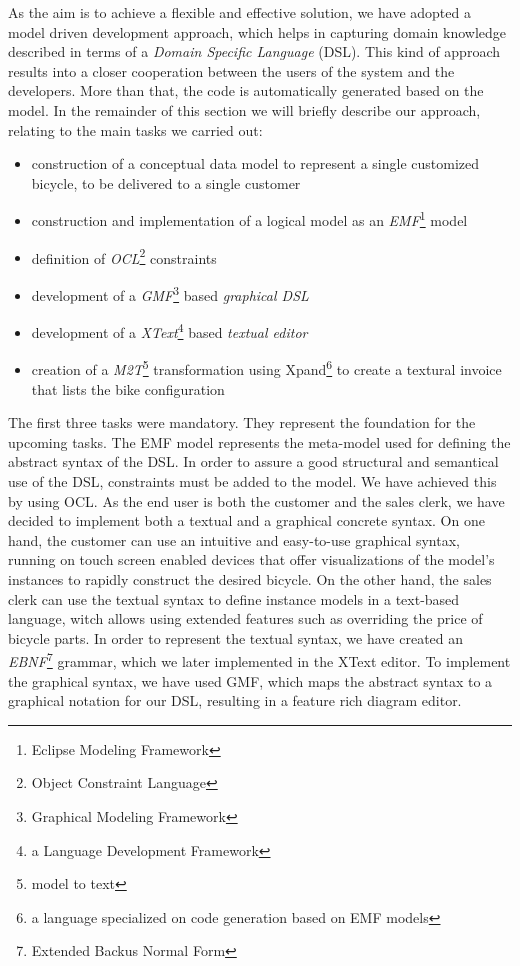 \noindent As the aim is to achieve a flexible and effective solution, we have
adopted a model driven development approach, which helps in capturing domain
knowledge described in terms of a \emph{Domain Specific Language} (DSL). This
kind of approach results into a closer cooperation between the users of the
system and the developers. More than that, the code is automatically generated
based on the model. In the remainder of this section we will briefly describe
our approach, relating to the main tasks we carried out:
\begin{itemize}
  \item construction of a conceptual data model to represent a single customized
  bicycle, to be delivered to a single customer
  \item construction and implementation of a logical model as an
  \emph{EMF}\footnote{Eclipse Modeling Framework} model
  \item definition of \emph{OCL}\footnote{Object Constraint Language}
  constraints
  \item development of a \emph{GMF}\footnote{Graphical Modeling Framework} based
  \emph{graphical DSL}
  \item development of a \emph{XText}\footnote{a Language Development Framework}
  based \emph{textual editor}
  \item creation of a \emph{M2T}\footnote{model to text} transformation using
  Xpand\footnote{a language specialized on code generation based on EMF models}
  to create a textural invoice that lists the bike configuration
\end{itemize} 

\noindent The first three tasks were mandatory. They represent the foundation
for the upcoming tasks. The EMF model represents the meta-model used for
defining the abstract syntax of the DSL. In order to assure a good structural
and semantical use of the DSL, constraints must be added to the model. We have
achieved this by using OCL. As the end user is both the customer and the sales
clerk, we have decided to implement both a textual and a graphical concrete syntax. On
one hand, the customer can use an intuitive and easy-to-use graphical
syntax, running on touch screen enabled devices that offer visualizations
of the model's instances to rapidly construct the desired bicycle. On the other
hand, the sales clerk can use the textual syntax to define instance models in a
text-based language, witch allows using extended features such as overriding
the price of bicycle parts. In order to represent the textual syntax, we have
created an \emph{EBNF}\footnote{Extended Backus Normal Form} grammar, which we later 
implemented in the XText editor. To implement the graphical syntax, we have used GMF, 
which maps the abstract syntax to a graphical notation for our DSL, resulting in
a feature rich diagram editor.\\

